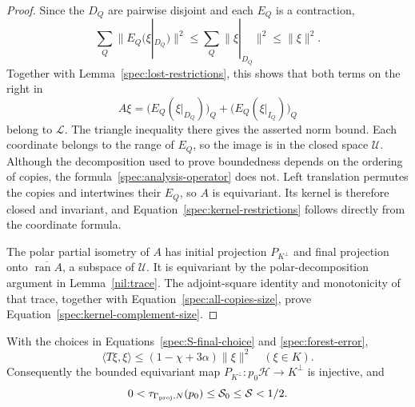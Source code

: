 \begin{proof}
Since the $D_Q$ are pairwise disjoint and each $E_Q$ is a contraction,
\[
 \sum_Q\|E_Q(\xi|_{D_Q})\|^2
       \leq\sum_Q\|\xi|_{D_Q}\|^2\leq\|\xi\|^2.
\]
Together with Lemma~\ref{spec:lost-restrictions}, this shows that both
terms on the right in
\[
 A\xi=\big(E_Q(\xi|_{D_Q})\big)_Q
             +\big(E_Q(\xi|_{I_Q})\big)_Q
\]
belong to $\mathcal L$. The triangle inequality there gives the
asserted norm bound. Each coordinate belongs to the range of $E_Q$,
so the image is in the closed space $\mathcal U$. Although the
decomposition used to prove boundedness depends on the ordering of
copies, the formula~\eqref{spec:analysis-operator} does not. Left
translation permutes the copies and intertwines their $E_Q$, so $A$
is equivariant. Its kernel is therefore closed and invariant, and
Equation~\eqref{spec:kernel-restrictions} follows directly from the
coordinate formula.

The polar partial isometry of $A$ has initial projection
$P_{K^\perp}$ and final projection onto $\overline{\operatorname{ran}A}$,
a subspace of $\mathcal U$. It is equivariant by the polar-decomposition
argument in Lemma~\ref{nil:trace}. The adjoint-square identity and
monotonicity of that trace, together with
Equation~\eqref{spec:all-copies-size}, prove
Equation~\eqref{spec:kernel-complement-size}.
\end{proof}

\begin{lemma}
\label{spec:kernel-form}
With the choices in Equations~\eqref{spec:S-final-choice} and
\eqref{spec:forest-error},
\begin{equation}
 \langle T\xi,\xi\rangle
       \leq(1-\chi+3\alpha)\|\xi\|^2
              \quad(\xi\in K).
 \label{spec:kernel-form-bound}
\end{equation}
Consequently the bounded equivariant map
$P_{K^\perp}:p_0\mathcal H\to K^\perp$ is injective, and
\begin{equation}
        0<\tau_{\Gamma_{\mathrm{proj}},N}(p_0)
               \leq\mathcal S_0\leq\mathcal S<1/2.
 \label{spec:strict-trace}
\end{equation}
\end{lemma}

